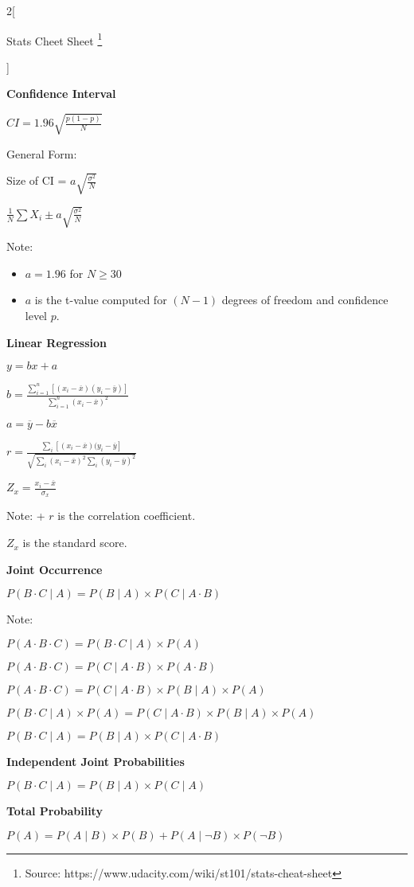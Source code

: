 \documentclass[9pt]{article}
\begin{document}
\begin{multicols}{2}[
	\begin{center}
		Stats Cheet Sheet \footnote{Source: https://www.udacity.com/wiki/st101/stats-cheat-sheet}
	\end{center}]
	
	\textbf{Confidence Interval}
	
	$CI=1.96\sqrt{\frac{p(1-p)}{N}}$
	
	General Form:
	
	Size of CI = $a\sqrt{\frac{\sigma^2}{N}}$
	
	$\frac{1}{N}\sum X_i\pm a\sqrt{\frac{\sigma^2}{N}}$
	
	Note:
	\begin{itemize}
	    \item $a=1.96$ for $N\ge30$
	    \item $a$ is the t-value computed for $(N-1)$ degrees of freedom and confidence level $p$.
	\end{itemize}

\columnbreak
	
	\textbf{Linear Regression}
	
	$y=bx+a$
	
	$b=\frac{\sum_{i=1}^n[(x_i-\overline{x})(y_i-\overline{y})]}{\sum_{i=1}^n(x_i-\overline{x})^2}$
	
	$a=\overline{y}-b\overline{x}$
	
	$r=\frac{\sum_i[(x_i-\overline{x})(y_i-\overline{y}]}{\sqrt{\sum_i(x_i-\overline{x})^2\sum_i(y_i-\overline{y})^2}}$
	
	$Z_x=\frac{x_i-\overline{x}}{\sigma_x}$
	
	Note: + $r$ is the correlation coefficient.
	
	 $Z_x$ is the standard score.


	\textbf{Joint Occurrence}
	
	$P(B\cdot C\mid A)=P(B\mid A)\times P(C\mid A\cdot B)$
	
	Note:
	
	$P(A\cdot B\cdot C)=P(B\cdot C\mid A)\times P(A)$
	
	$P(A\cdot B\cdot C)=P(C\mid A\cdot B)\times P(A\cdot B)$
	
	$P(A\cdot B\cdot C)=P(C\mid A\cdot B)\times P(B\mid A)\times P(A)$
	
	$P(B\cdot C\mid A)\times P(A)=P(C\mid A\cdot B)\times P(B\mid A)\times P(A)$
	
	$P(B\cdot C\mid A)=P(B\mid A)\times P(C\mid A\cdot B)$
	
	
	\textbf{Independent Joint Probabilities}
	
	$P(B\cdot C\mid A)=P(B\mid A)\times P(C\mid A)$
	
	
	\textbf{Total Probability}
	
	$P(A)=P(A\mid B)\times P(B)+P(A\mid\neg B)\times P(\neg B)$
	

\end{multicols}
\end{document}
